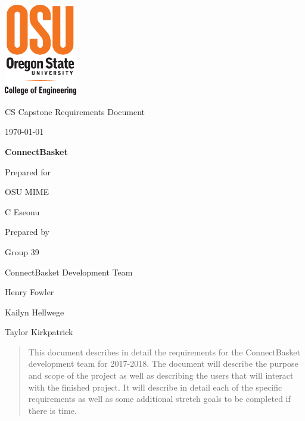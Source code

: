 \documentclass[onecolumn, draftclsnofoot,10pt, compsoc]{IEEEtran}
\def \CapstoneTeamName{		ConnectBasket Development Team}
\def \CapstoneTeamNumber{		39}
\def \GroupMemberOne{			Henry Fowler}
\def \GroupMemberTwo{			Kailyn Hellwege}
\def \GroupMemberThree{			Taylor Kirkpatrick}
\def \CapstoneProjectName{		ConnectBasket}
\def \CapstoneSponsorCompany{	OSU MIME}
\def \CapstoneSponsorPerson{		C Eseonu}
\def \DocType{		%
				Requirements Document
				}
\newcommand{\NameSigPair}[1]{\par
\makebox[2.75in][r]{#1} \hfil 	\makebox[3.25in]{\makebox[2.25in]{\hrulefill} \hfill		\makebox[.75in]{\hrulefill}}
\par\vspace{-12pt} \textit{\tiny\noindent
\makebox[2.75in]{} \hfil		\makebox[3.25in]{\makebox[2.25in][r]{Signature} \hfill	\makebox[.75in][r]{Date}}}}
\renewcommand{\NameSigPair}[1]{#1}
\begin{document}
\begin{titlepage}
    \begin{singlespace}
    	\includegraphics[height=4cm]{coe_v_spot1}
        \hfill 
        \par\vspace{.2in}
        \centering
        \scshape{
            \huge CS Capstone \DocType \par
            {\large\today}\par
            \vspace{.5in}
            \textbf{\Huge\CapstoneProjectName}\par
            \vfill
            {\large Prepared for}\par
            \Huge \CapstoneSponsorCompany\par
            \vspace{5pt}
            {\Large\NameSigPair{\CapstoneSponsorPerson}\par}
            {\large Prepared by }\par
            Group\CapstoneTeamNumber\par
            \CapstoneTeamName\par 
            \vspace{5pt}
            {\Large
                \NameSigPair{\GroupMemberOne}\par
                \NameSigPair{\GroupMemberTwo}\par
                \NameSigPair{\GroupMemberThree}\par
            }
            \vspace{20pt}
        }
        \begin{abstract}
        This document describes in detail the requirements for the ConnectBasket development team for 2017-2018. The document will describe the purpose and scope of the project as well as describing the users that will interact with the finished project. It will describe in detail each of the specific requirements as well as some additional stretch goals to be completed if there is time.
        \end{abstract}     
    \end{singlespace}
\end{titlepage}
\newpage
{}
\tableofcontents
\clearpage
\end{document}
